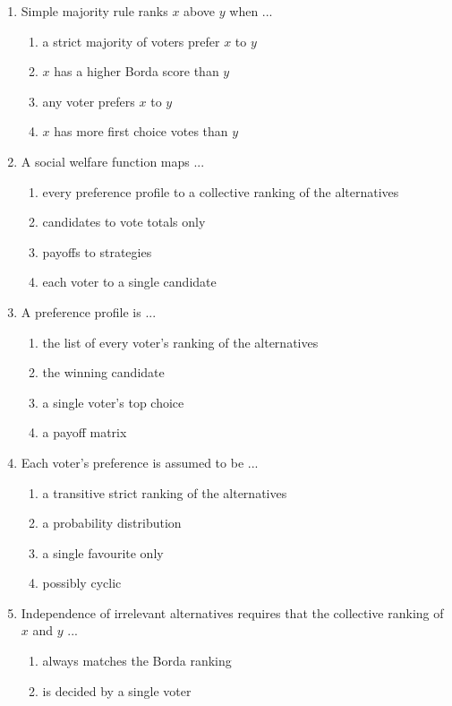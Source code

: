 \documentclass[11pt]{article}
\begin{document}
\begin{enumerate}[itemsep=6pt]
\begin{enumerate}
  \end{enumerate}
  \item Simple majority rule ranks \(x\) above \(y\) when ...
  \begin{enumerate}
    \item a strict majority of voters prefer \(x\) to \(y\)
    \item \(x\) has a higher Borda score than \(y\)
    \item any voter prefers \(x\) to \(y\)
    \item \(x\) has more first choice votes than \(y\)
  \end{enumerate}
  \item A social welfare function maps ...
  \begin{enumerate}
    \item every preference profile to a collective ranking of the alternatives
    \item candidates to vote totals only
    \item payoffs to strategies
    \item each voter to a single candidate
  \end{enumerate}
  \item A preference profile is ...
  \begin{enumerate}
    \item the list of every voter's ranking of the alternatives
    \item the winning candidate
    \item a single voter's top choice
    \item a payoff matrix
  \end{enumerate}
  \item Each voter's preference is assumed to be ...
  \begin{enumerate}
    \item a transitive strict ranking of the alternatives
    \item a probability distribution
    \item a single favourite only
    \item possibly cyclic
  \end{enumerate}
  \item Independence of irrelevant alternatives requires that the collective ranking of \(x\) and \(y\) ...
  \begin{enumerate}
    \item always matches the Borda ranking
    \item is decided by a single voter

\end{enumerate}
\end{enumerate}
\end{document}
